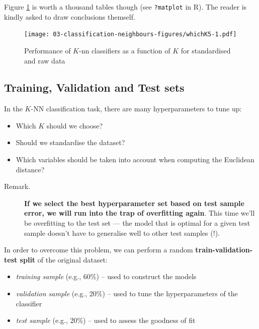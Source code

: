 \documentclass[10pt,b5paper,krantz1]{krantz}
\providecommand{\tightlist}{%
  \setlength{\itemsep}{0pt}\setlength{\parskip}{0pt}}
\begin{document}
Figure \ref{fig:whichK5} is worth a thousand tables though (see \texttt{?matplot} in R). The reader is kindly asked to draw conclusions themself.

\begin{figure}
\hypertarget{fig:whichK5}{%
\centering
\texttt{[image: 03-classification-neighbours-figures/whichK5-1.pdf]}
\caption{Performance of \(K\)-nn classifiers as a function of \(K\) for standardised and raw data}\label{fig:whichK5}
}
\end{figure}

\hypertarget{training-validation-and-test-sets}{%
\subsection{Training, Validation and Test sets}\label{training-validation-and-test-sets}}

In the \(K\)-NN classification task, there are many hyperparameters to tune up:

\begin{itemize}
\item
  Which \(K\) should we choose?
\item
  Should we standardise the dataset?
\item
  Which variables should be taken into account when computing the Euclidean distance?
\end{itemize}

\begin{description}
\item[Remark.]
\textbf{If we select the best hyperparameter set based on test
sample error, we will run into the trap of overfitting again}.
This time we'll be overfitting to the test set --- the model that is optimal
for a given test sample doesn't have to generalise well to other test samples (!).
\end{description}

In order to overcome this problem,
we can perform a random \textbf{train-validation-test split} of the original dataset:

\begin{itemize}
\tightlist
\item
  \emph{training sample} (e.g., 60\%) -- used to construct the models
\item
  \emph{validation sample} (e.g., 20\%) -- used to tune the hyperparameters of the classifier
\item
  \emph{test sample} (e.g., 20\%) -- used to assess the goodness of fit
\end{itemize}
\end{document}
